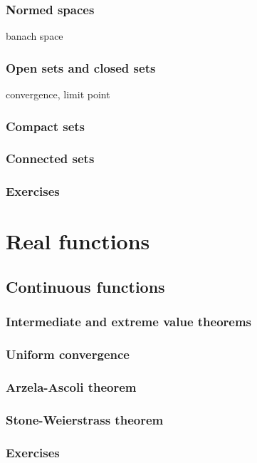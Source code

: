 \documentclass{../note}
\begin{document}
\section{Normed spaces}
banach space

\section{Open sets and closed sets}
convergence, limit point
\section{Compact sets}
\section{Connected sets}



\section*{Exercises}








\part{Real functions}

\chapter{Continuous functions}
\section{Intermediate and extreme value theorems}
\section{Uniform convergence}
\section{Arzela-Ascoli theorem}
\section{Stone-Weierstrass theorem}

\section*{Exercises}
\end{document}
